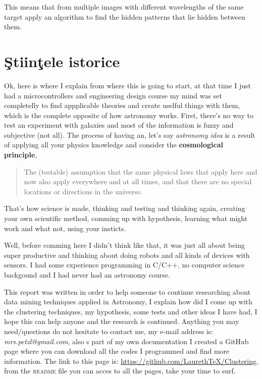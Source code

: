 This means that from multiple images with different wavelengths of the same target apply an algorithm to find the hidden patterns that lie hidden between them.

\section{Ştiinţele istorice}
Ok, here is where I explain from where this is going to start, at that time I just had a microcontrollers and engineering design course my mind was set completelly to find appplicable theories and create uselful things with them, which is the complete opposite of how astronomy works. First, there's no way to test an experiment with galaxies and most of the information is fuzzy and subjective (not all). The process of having an, let's say \emph{astronomy idea} is a result of applying all your physics knowledge and consider the \textbf{cosmological principle},
\begin{quote}
The (testable) assumption that the same physical laws that apply here and now also apply everywhere and at all times, and that there are no special locations or directions in the universe.
\end{quote}

That's how science is made, thinking and testing and thinking again, creating your own scientific method, comming up with hypothesis, learning what might work and what not, using your insticts. 

Well, before comming here I didn't think like that, it was just all about being super productive and thinking about doing robots and all kinds of devices with sensors. I had some experience programming in C/C++, no computer science backgound and I had never had an astronomy course.

This report was written in order to help someone to continue researching about data mining techniques applied in Astronomy, I explain how did I come up with the clustering techniques, my hypothesis, some tests and other ideas I have had, I hope this can help anyone and the research is continued. Anything you may need/questions do not hesitate to contact me, my e-mail address is: \emph{mrs.petzl@gmail.com}, also s part of my own documentation I created a GitHub page where you can download all the codes I programmed and find more information. The link to this page is: \url{https://github.com/LaurethTeX/Clustering}, from the \textsc{readme} file you can acces to all the pages, take your time to surf.


